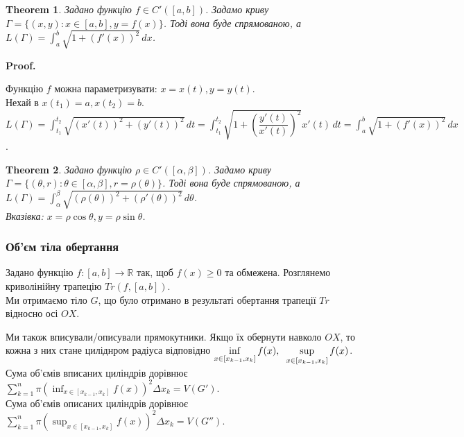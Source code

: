 \documentclass[a4paper, 10pt]{article}
\makeatletter
\def\huge{\displaystyle}
\def\qed{$\blacksquare$}
\theoremstyle{theoremdd}
\newtheorem{theorem}{Theorem}[subsection]
\theoremstyle{theoremdd}
\theoremstyle{theoremdd}
\theoremstyle{theoremdd}
\theoremstyle{theoremdd}
\theoremstyle{theoremdd}
\theoremstyle{theoremdd}
\theoremstyle{theoremdd}
\renewenvironment{proof}[1][Proof.\\]{\par
\pushQED{\hfill \qed}%
\normalfont \topsep6\p@\@plus6\p@\relax
\trivlist
\item\relax
{\bfseries
#1\@addpunct{.}}\hspace\labelsep\ignorespaces
}{%
\popQED\endtrivlist\@endpefalse
}
\makeatother
\begin{document}
\begin{theorem}
Задано функцію $f \in C'([a,b])$. Задамо криву $\Gamma = \{(x,y): x \in [a,b], y = f(x) \}$. Тоді вона буде спрямованою, а $L(\Gamma) = \huge\int_a^b \sqrt{1+(f'(x))^2}\,dx$.
\end{theorem}

\begin{proof}
Функцію $f$ можна параметризувати: $x = x(t), y = y(t)$.\\
Нехай в $x(t_1) = a, x(t_2) = b$.\\
$L(\Gamma) = \huge\int_{t_1}^{t_2} \sqrt{(x'(t))^2 + (y'(t))^2}\,dt = \int_{t_1}^{t_2} \sqrt{1 + \left(\dfrac{y'(t)}{x'(t)}\right)^2} x'(t)\,dt = \int_a^b \sqrt{1+(f'(x))^2}\,dx$.
\end{proof}

\begin{theorem}
Задано функцію $\rho \in C'([\alpha,\beta])$. Задамо криву $\Gamma = \{ (\theta,r): \theta \in [\alpha,\beta], r = \rho (\theta) \}$. Тоді вона буде спрямованою, а $L(\Gamma) = \huge\int_{\alpha}^{\beta} \sqrt{(\rho (\theta))^2 + (\rho'(\theta))^2}\,d\theta$.\\
\textit{Вказівка: $x = \rho \cos \theta, y = \rho \sin \theta$}.
\end{theorem}

\subsubsection{Об'єм тіла обертання}
Задано функцію $f: [a,b] \to \mathbb{R}$ так, щоб $f(x) \geq 0$ та обмежена. Розглянемо криволінійну трапецію $Tr(f,[a,b])$.\\
Ми отримаємо тіло $G$, що було отримано в результаті обертання трапеції $Tr$ відносно осі $OX$.
\begin{figure}[H]
\centering
{}
\qquad
{}
\end{figure}
Ми також вписували/описували прямокутники. Якщо їх обернути навколо $OX$, то кожна з них стане циліднром радіуса відповідно $\huge\inf_{x \in [x_{k-1},x_k]} f(x), \hspace{0.2cm} \huge\sup_{x \in [x_{k-1},x_k]} f(x)$.\\
Сума об'ємів вписаних циліндрів дорівнює $\huge\sum_{k=1}^n \pi \left( \huge\inf_{x \in [x_{k-1},x_k]} f(x) \right)^2 \Delta x_k = V(G')$.\\
Сума об'ємів описаних циліндрів дорівнює $\huge\sum_{k=1}^n \pi \left( \huge\sup_{x \in [x_{k-1},x_k]} f(x) \right)^2 \Delta x_k = V(G'')$.
\end{document}
